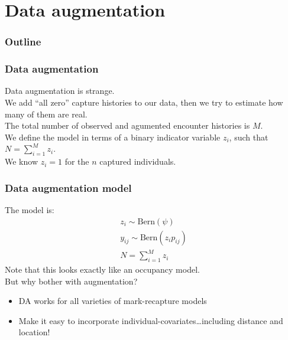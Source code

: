 \documentclass[color=usenames,dvipsnames]{beamer}\usepackage[]{graphicx}\usepackage[]{color}
\begin{document}
\section{Data augmentation}




\begin{frame}
  \frametitle{Outline}
  \Large
  \tableofcontents[currentsection]
\end{frame}



\begin{frame}
  \frametitle{Data augmentation}
  Data augmentation is strange. \\
  \pause
  \vfill
  We add ``all zero'' capture histories to our data, then we try to
  estimate how many of them are real. \\ 
  \pause
  \vfill
  The total number of observed and agumented encounter histories is
  $M$. \\
  \pause
  \vfill
  We define the model in terms of a binary indicator variable $z_i$,
  such that $N=\sum_{i=1}^M z_i$. \\
  \pause
  \vfill
  We know $z_i=1$ for the $n$ captured individuals. \\
\end{frame}






\begin{frame}
  \frametitle{Data augmentation model}
  The model is:
  \begin{gather*}
    z_i \sim \mathrm{Bern}(\psi) \\
    y_{ij} \sim \mathrm{Bern}(z_i p_{ij}) \\
    N=\sum_{i=1}^M z_i
  \end{gather*}
  \pause \vfill
  Note that this looks exactly like an occupancy model. \\
  \pause \vfill
  But why bother with augmentation?
  \begin{itemize}
    \item DA works for \alert{all} varieties of mark-recapture models
    \item Make it easy to incorporate
      individual-covariates\dots\pause including distance and
      location!   
  \end{itemize}
\end{frame}
\end{document}
